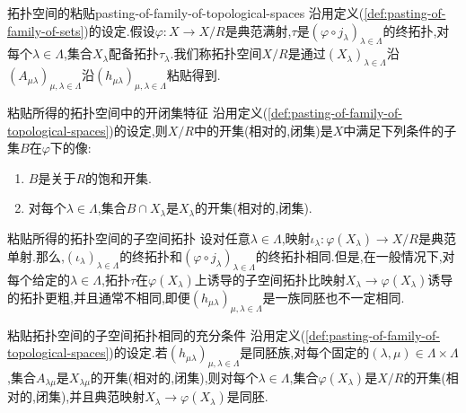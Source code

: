\begin{definition}{拓扑空间的粘贴}{pasting-of-family-of-topological-spaces}
	沿用定义(\ref{def:pasting-of-family-of-sets})的设定.假设$\varphi:X\to X/R$是典范满射,$\tau$是$\left(\varphi\circ j_{\lambda}\right)_{\lambda\in\Lambda}$的终拓扑,对每个$\lambda\in\Lambda$,集合$X_{\lambda}$配备拓扑$\tau_{\lambda}$.我们称拓扑空间$X/R$是通过$\left(X_{\lambda}\right)_{\lambda\in\Lambda}$沿$\left(A_{\mu\lambda}\right)_{\mu,\lambda\in\Lambda}$沿$\left(h_{\mu\lambda}\right)_{\mu,\lambda\in\Lambda}$粘贴得到.
\end{definition}

\begin{corollary}{粘贴所得的拓扑空间中的开闭集特征}{}
	沿用定义(\ref{def:pasting-of-family-of-topological-spaces})的设定,则$X/R$中的开集(相对的,闭集)是$X$中满足下列条件的子集$B$在$\varphi$下的像:
	\begin{enumerate}
		\item $B$是关于$R$的饱和开集.
		\item 对每个$\lambda\in\Lambda$,集合$B\cap X_{\lambda}$是$X_{\lambda}$的开集(相对的,闭集).
	\end{enumerate}
\end{corollary}

\begin{remark}{粘贴所得的拓扑空间的子空间拓扑}{}
	设对任意$\lambda\in\Lambda$,映射$\iota_{\lambda}:\varphi\left(X_{\lambda}\right)\to X/R$是典范单射.那么,$\left(\iota_{\lambda}\right)_{\lambda\in\Lambda}$的终拓扑和$\left(\varphi\circ j_{\lambda}\right)_{\lambda\in\Lambda}$的终拓扑相同.但是,在一般情况下,对每个给定的$\lambda\in\Lambda$,拓扑$\tau$在$\varphi\left(X_{\lambda}\right)$上诱导的子空间拓扑比映射$X_{\lambda}\to\varphi\left(X_{\lambda}\right)$诱导的拓扑更粗,并且通常不相同,即便$\left(h_{\mu\lambda}\right)_{\mu,\lambda\in\Lambda}$是一族同胚也不一定相同.
\end{remark}

\begin{proposition}{粘贴拓扑空间的子空间拓扑相同的充分条件}{}
	沿用定义(\ref{def:pasting-of-family-of-topological-spaces})的设定.若$\left(h_{\mu\lambda}\right)_{\mu,\lambda\in\Lambda}$是同胚族,对每个固定的$\left(\lambda,\mu\right)\in\Lambda\times\Lambda$,集合$A_{\lambda\mu}$是$X_{\lambda\mu}$的开集(相对的,闭集),则对每个$\lambda\in\Lambda$,集合$\varphi\left(X_{\lambda}\right)$是$X/R$的开集(相对的,闭集),并且典范映射$X_{\lambda}\to\varphi\left(X_{\lambda}\right)$是同胚.
\end{proposition}



